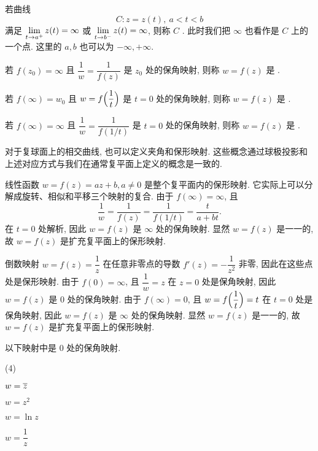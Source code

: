 若曲线
\[
  C: z=z(t),\ a<t<b
\]
满足 $\lim\limits_{t\rightarrow a^+}z(t)=\infty$ 或 $\lim\limits_{t\rightarrow b^-}z(t)=\infty$, 则称 $C$ .
此时我们把 $\infty$ 也看作是 $C$ 上的一个点.
这里的 $a,b$ 也可以为 $-\infty,+\infty$.

\begin{definition}
  \begin{enuma}
    \item 若 $f(z_0)=\infty$ 且 $\dfrac1w=\dfrac1{f(z)}$ 是 $z_0$ 处的保角映射, 则称 $w=f(z)$ 是 .
    \item 若 $f(\infty)=w_0$ 且 $w=f\Bigl(\dfrac1t\Bigr)$ 是 $t=0$ 处的保角映射, 则称 $w=f(z)$ 是 .
    \item 若 $f(\infty)=\infty$ 且 $\dfrac1w=\dfrac1{f(1/t)}$ 是 $t=0$ 处的保角映射, 则称 $w=f(z)$ 是 .
  \end{enuma}
\end{definition}

对于复球面上的相交曲线, 也可以定义夹角和保形映射.
这些概念通过球极投影和上述对应方式与我们在通常复平面上定义的概念是一致的.

\begin{example}
  \label{exam:linear-transform}
  线性函数 $w=f(z)=az+b,a\neq 0$ 是整个复平面内的保形映射.
  它实际上可以分解成旋转、相似和平移三个映射的复合.
  由于 $f(\infty)=\infty$, 且
  \[
    \dfrac1w=\dfrac1{f(z)}=\dfrac1{f(1/t)}=\dfrac{t}{a+bt}.
  \]
  在 $t=0$ 处解析, 因此 $w=f(z)$ 是 $\infty$ 处的保角映射.
  显然 $w=f(z)$ 是一一的, 故 $w=f(z)$ 是扩充复平面上的保形映射.
\end{example}

\begin{example}
  \label{exam:inverse-transform}
  倒数映射 $w=f(z)=\dfrac1z$ 在任意非零点的导数 $f'(z)=-\dfrac1{z^2}$ 非零, 因此在这些点处是保形映射.
  由于 $f(0)=\infty$, 且 $\dfrac1w=z$ 在 $z=0$ 处是保角映射, 因此 $w=f(z)$ 是 $0$ 处的保角映射.
  由于 $f(\infty)=0$, 且 $w=f\Bigl(\dfrac1t\Bigr)=t$ 在 $t=0$ 处是保角映射, 因此 $w=f(z)$ 是 $\infty$ 处的保角映射.
  显然 $w=f(z)$ 是一一的, 故 $w=f(z)$ 是扩充复平面上的保形映射.
\end{example}

\begin{exercise}
  以下映射中\fillbrace{}是 $0$ 处的保角映射.
  \begin{exchoice}(4)
    \item $w=\overline z$
    \item $w=z^2$
    \item $w=\ln z$
    \item $w=\dfrac1z$
  \end{exchoice}
\end{exercise}

